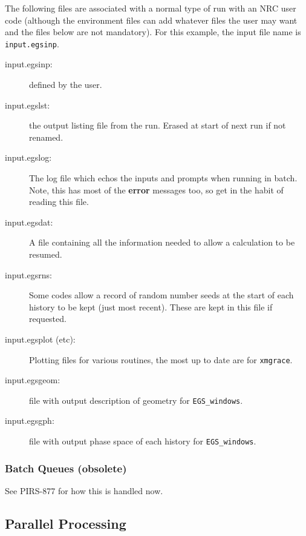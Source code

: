 The following files are associated with a normal type of run with an NRC
user code (although the environment files can add whatever files the user
may want and the files below are not mandatory).  For
this example, the input file name is \verb+input.egsinp+.
\begin{description}
\item [input.egsinp:] defined by the user.
\item [input.egslst:]  the output listing file from the run. Erased
at start of next run if not renamed.
\item [input.egslog:] The log file which echos the inputs and
prompts when running in batch. Note, this has most of the {\bf error}
messages too, so get in the habit of reading this file.
\item [input.egsdat:] A file containing all the information needed to
allow a calculation to be resumed.
\item [input.egsrns:] Some codes allow a record of random number seeds
at the start of each history to be kept (just most recent). These are
kept in this file if requested.
\item [input.egsplot (etc):] Plotting files for various routines, the
most up to date are for \verb+xmgrace+.
\item [input.egsgeom:] file with output description of geometry for
\verb+EGS_windows+.
\item [input.egsgph:] file with output phase space of each history for
\verb+EGS_windows+.
\end{description}


\subsubsection{Batch Queues (obsolete)}
\label{batch_que}
See PIRS-877 for how this is handled now.


\subsection{Parallel Processing}
\label{pprocess}


